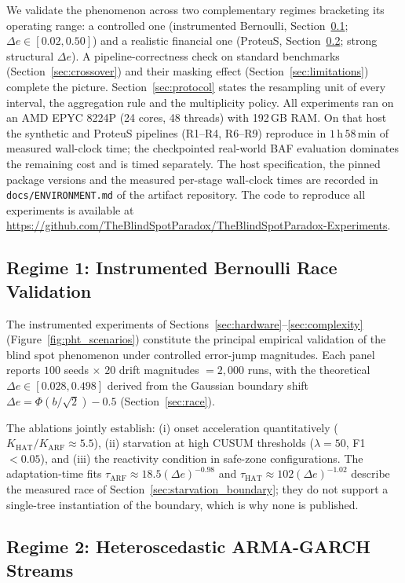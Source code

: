 \documentclass[smallextended]{svjour3}
\newcommand{\RepoURL}{https://github.com/TheBlindSpotParadox/TheBlindSpotParadox-Experiments}
\begin{document}
We validate the phenomenon across two complementary regimes bracketing its operating range: a controlled one (instrumented Bernoulli, Section~\ref{sec:bernoulli_validation}; $\Delta e \in [0.02, 0.50]$) and a realistic financial one (ProteuS, Section~\ref{sec:proteus}; strong structural $\Delta e$). A pipeline-correctness check on standard benchmarks (Section~\ref{sec:crossover}) and their masking effect (Section~\ref{sec:limitations}) complete the picture. Section~\ref{sec:protocol} states the resampling unit of every interval, the aggregation rule and the multiplicity policy. All experiments ran on an AMD EPYC 8224P (24 cores, 48 threads) with 192\,GB RAM. On that host the synthetic and ProteuS pipelines (R1--R4, R6--R9) reproduce in $1$\,h\,$58$\,min of measured wall-clock time; the checkpointed real-world BAF evaluation dominates the remaining cost and is timed separately. The host specification, the pinned package versions and the measured per-stage wall-clock times are recorded in \texttt{docs/ENVIRONMENT.md} of the artifact repository. The code to reproduce all experiments is available at \url{\RepoURL}.

\subsection{Regime 1: Instrumented Bernoulli Race Validation}\label{sec:bernoulli_validation}

The instrumented experiments of Sections~\ref{sec:hardware}--\ref{sec:complexity} (Figure~\ref{fig:pht_scenarios}) constitute the principal empirical validation of the blind spot phenomenon under controlled error-jump magnitudes. Each panel reports $100$ seeds $\times$ $20$ drift magnitudes $= 2{,}000$ runs, with the theoretical $\Delta e \in [0.028, 0.498]$ derived from the Gaussian boundary shift $\Delta e = \Phi(b/\sqrt{2}) - 0.5$ (Section~\ref{sec:race}).

The ablations jointly establish: (i) onset acceleration quantitatively ($K_{\mathrm{HAT}}/K_{\mathrm{ARF}} \approx 5.5$), (ii) starvation at high CUSUM thresholds ($\lambda = 50$, F1 $< 0.05$), and (iii) the reactivity condition in safe-zone configurations. The adaptation-time fits $\tau_{\mathrm{ARF}} \approx 18.5(\Delta e)^{-0.98}$ and $\tau_{\mathrm{HAT}} \approx 102(\Delta e)^{-1.02}$ describe the measured race of Section~\ref{sec:starvation_boundary}; they do not support a single-tree instantiation of the boundary, which is why none is published.

\subsection{Regime 2: Heteroscedastic ARMA-GARCH Streams}\label{sec:proteus}
\end{document}
